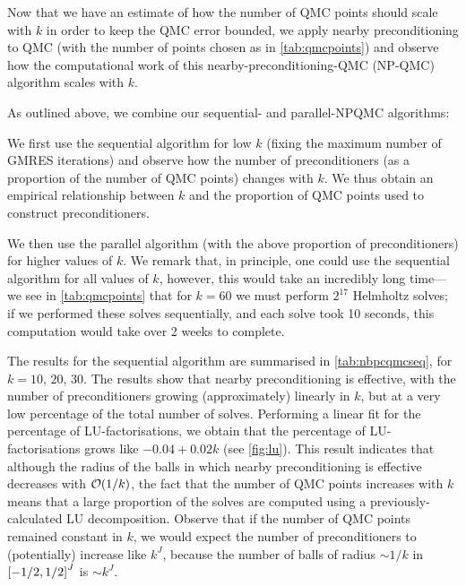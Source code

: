 Now that we have an estimate of how the number of QMC points should scale with $k$ in order to keep the QMC error bounded, we apply nearby preconditioning to QMC (with the number of points chosen as in \cref{tab:qmcpoints}) and observe how the computational work of this nearby-preconditioning-QMC (NP-QMC) algorithm scales with $k.$

As outlined above, we combine our sequential- and parallel-NPQMC algorithms:\label{page:seqandpar}
\bit
\item We first use the sequential algorithm for low $k$ (fixing the maximum number of GMRES iterations) and observe how the number of preconditioners (as a proportion of the number of QMC points) changes with $k$. We thus obtain an empirical relationship between $k$ and the proportion of QMC points used to construct preconditioners.
  \item We then use the parallel algorithm (with the above proportion of preconditioners) for higher values of $k.$
    \eit
    We remark that, in principle, one could use the sequential algorithm for all values of $k$, however, this would take an incredibly long time--- we see in \cref{tab:qmcpoints} that for $k=60$ we must perform $2^{17}$ Helmholtz solves; if we performed these solves sequentially, and each solve took 10 seconds, this computation would take over 2 weeks to complete.

    The results for the sequential algorithm are summarised in \cref{tab:nbpcqmcseq}, for $k = 10,\,20,\,30$. The results show that nearby preconditioning is effective, with the number of preconditioners growing (approximately) linearly in $k$, but at a very low percentage of the total number of solves. Performing a linear fit for the percentage of LU-factorisations, we obtain that the percentage of LU-factorisations grows like $-0.04 + 0.02k$ (see \cref{fig:lu}). This result indicates that although the radius of the balls in which nearby preconditioning is effective decreases with $\cO\mleft(1/k\mright)$, the fact that the number of QMC points increases with $k$ means that a large proportion of the solves are computed using a previously-calculated LU decomposition. Observe that if the number of QMC points remained constant in $k$, we would expect the number of preconditioners to (potentially) increase like $k^J$, because the number of balls of radius $\sim 1/k$ in $\cube{J}$ is $\sim k^J.$

